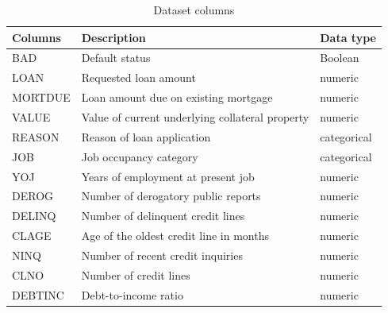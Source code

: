     \begin{table}[H]
        \small
        \setlength{\tabcolsep}{8pt}
        \renewcommand{\arraystretch}{1.3}
        \begin{center}
            \caption[Dataset columns]{Dataset columns}\label{tab:dataset}
        \begin{tabular}{@{} l p{8cm} l @{}}
        \toprule
        \textbf{Columns} & \textbf{Description} & \textbf{Data type}\\
        \midrule
        \hline
        BAD & Default status & Boolean \\

        LOAN & Requested loan amount & numeric \\

        MORTDUE & Loan amount due on existing mortgage & numeric \\

        VALUE & Value of current underlying collateral property & numeric \\

        REASON & Reason of loan application & categorical \\
        JOB & Job occupancy category & categorical \\

        YOJ & Years of employment at present job & numeric \\

        DEROG & Number of derogatory public reports & numeric \\

        DELINQ & Number of delinquent credit lines & numeric \\

        CLAGE & Age of the oldest credit line in months & numeric \\

        NINQ & Number of recent credit inquiries & numeric \\

        CLNO & Number of credit lines & numeric \\

        DEBTINC & Debt-to-income ratio & numeric \\
        \hline
        \bottomrule
        \end{tabular}
        \end{center}
        \begin{center} %
        \end{center}
    \end{table}

